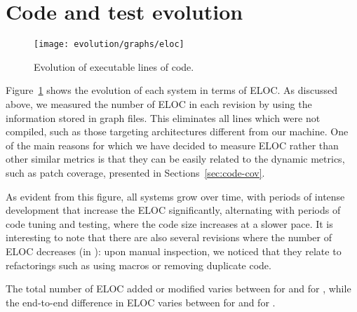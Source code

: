 \section{Code and test evolution}
\label{sec:code-test-evol}

\begin{figure}[t]
%
\texttt{[image: evolution/graphs/eloc]}
\caption{Evolution of executable lines of code.}
\label{fig:codebase-evol}
\end{figure}


Figure~\ref{fig:codebase-evol} shows the evolution of each system in
terms of ELOC.  As discussed above, we measured the number of ELOC in
each revision by using the information stored in \gcov graph files.
This eliminates all lines which were not compiled, such as those
targeting architectures different from our machine.  One of the main
reasons for which we have decided to measure ELOC rather than other
similar metrics is that they can be easily related to the dynamic
metrics, such as patch coverage, presented in
Sections~\ref{sec:code-cov}.


As evident from this figure, all \numSystems systems grow over time,
with periods of intense development that increase the ELOC
significantly, alternating with periods of code tuning and testing,
where the code size increases at a slower pace.  It is interesting to
note that there are also several revisions where the number of ELOC
decreases (\eg in \zeromq): upon manual inspection, we noticed that
they relate to refactorings such as using macros or removing duplicate
code.


The total number of ELOC added or modified varies
between \redisPatchTotal for \redis and \lighttpdtwoPatchTotal
for \lighttpdtwo, while the end-to-end difference in ELOC varies
between \beanstalkdDeltaSize for \beanstalkd and \lighttpdtwoDeltaSize
for \lighttpdtwo.

